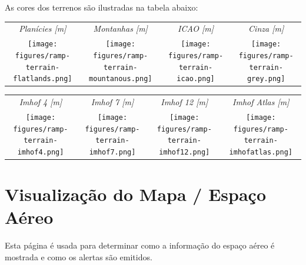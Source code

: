 As cores dos terrenos são ilustradas na tabela abaixo:

\begin{longtable}{c c c c}
\em{Planícies [m]} & \em{Montanhas [m]} & \em{ICAO [m]} & \em{Cinza [m]} \\
\nopagebreak[4]
\texttt{[image: figures/ramp-terrain-flatlands.png]}&
\texttt{[image: figures/ramp-terrain-mountanous.png]}&
\texttt{[image: figures/ramp-terrain-icao.png]}&
\texttt{[image: figures/ramp-terrain-grey.png]}
\end{longtable}

\begin{longtable}{c c c c}
\em{Imhof 4 [m]} & \em{Imhof 7 [m]} & \em{Imhof 12 [m]} & \em{Imhof Atlas [m]} \\
\nopagebreak[4]
\texttt{[image: figures/ramp-terrain-imhof4.png]}&
\texttt{[image: figures/ramp-terrain-imhof7.png]}&
\texttt{[image: figures/ramp-terrain-imhof12.png]}&
\texttt{[image: figures/ramp-terrain-imhofatlas.png]}
\end{longtable}


\section{Visualização do Mapa / Espaço Aéreo }

Esta página é usada para determinar como a informação do espaço aéreo é mostrada e como os alertas são emitidos.

